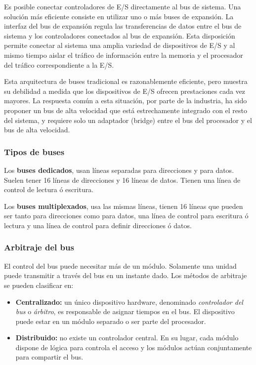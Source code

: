 Es posible conectar controladores de E/S directamente al bus de sistema. Una solución más eficiente consiste en utilizar uno o más buses de expansión. La interfaz del bus de expansión regula las transferencias de datos entre el bus de sistema y los controladores conectados al bus de expansión. Esta disposición permite conectar al sistema una amplia variedad de dispositivos de E/S y al mismo tiempo aislar el tráfico de información entre la memoria y el procesador del tráfico correspondiente a la E/S.

Esta arquitectura de buses tradicional es razonablemente eficiente, pero muestra su debilidad a medida que los dispositivos de E/S ofrecen prestaciones cada vez mayores. La respuesta común a esta situación, por parte de la industria, ha sido proponer un bus de alta velocidad que está estrechamente integrado con el resto del sistema, y requiere solo un adaptador (bridge) entre el bus del procesador y el bus de alta velocidad.

\subsubsection*{Tipos de buses}

Los \textbf{buses dedicados}, usan líneas separadas para direcciones y para datos. Suelen tener 16 líneas de direcciones y 16 líneas de datos. Tienen una línea de control de lectura ó escritura.

Los \textbf{buses multiplexados}, usa las mismas líneas, tienen 16 líneas que pueden ser tanto para direcciones como para datos, una línea de control para escritura ó lectura y una línea de control para definir direcciones ó datos.

\subsubsection*{Arbitraje del bus}

El control del bus puede necesitar más de un módulo. Solamente una unidad puede transmitir a través del bus en un instante dado. Los métodos de arbitraje se pueden clasificar en:

\begin{itemize}
  \item \textbf{Centralizado:} un único dispositivo hardware, denominado \textit{controlador del bus} o \textit{árbitro}, es responsable de asignar tiempos en el bus. El dispositivo puede estar en un módulo separado o ser parte del procesador.
  \item \textbf{Distribuido:} no existe un controlador central. En su lugar, cada módulo dispone de lógica para controla el acceso y los módulos actúan conjuntamente para compartir el bus. 
\end{itemize}

